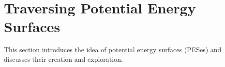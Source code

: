 \section{Traversing Potential Energy Surfaces}
\label{sec:pes}

This section introduces the idea of potential energy surfaces (PESes) and discusses their creation and exploration.

\incomplete








